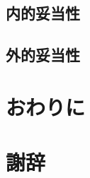 \documentclass[11pt,dvipdfmx]{jreport}
\begin{document}
\section{内的妥当性}

\section{外的妥当性}

\chapter{おわりに}

\chapter*{謝辞}











% 
% 
% 

\end{document}
